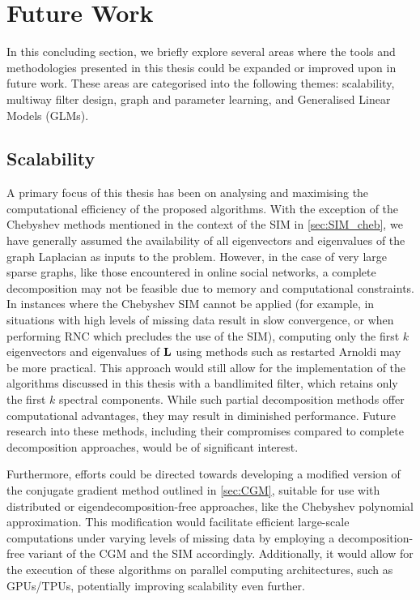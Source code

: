 \section{Future Work}

In this concluding section, we briefly explore several areas where the tools and methodologies presented in this thesis could be expanded or improved upon in future work. These areas are categorised into the following themes: scalability, multiway filter design, graph and parameter learning, and Generalised Linear Models (GLMs).

\subsection{Scalability}

A primary focus of this thesis has been on analysing and maximising the computational efficiency of the proposed algorithms. With the exception of the Chebyshev methods mentioned in the context of the SIM in \cref{sec:SIM_cheb}, we have generally assumed the availability of all eigenvectors and eigenvalues of the graph Laplacian as inputs to the problem. However, in the case of very large sparse graphs, like those encountered in online social networks, a complete decomposition may not be feasible due to memory and computational constraints. In instances where the Chebyshev SIM cannot be applied (for example, in situations with high levels of missing data result in slow convergence, or when performing RNC which precludes the use of the SIM), computing only the first $k$ eigenvectors and eigenvalues of $\mathbf{L}$ using methods such as restarted Arnoldi \citep{Lehoucq1998} may be more practical. This approach would still allow for the implementation of the algorithms discussed in this thesis with a bandlimited filter, which retains only the first $k$ spectral components. While such partial decomposition methods offer computational advantages, they may result in diminished performance. Future research into these methods, including their compromises compared to complete decomposition approaches, would be of significant interest.

Furthermore, efforts could be directed towards developing a modified version of the conjugate gradient method outlined in \cref{sec:CGM}, suitable for use with distributed or eigendecomposition-free approaches, like the Chebyshev polynomial approximation. This modification would facilitate efficient large-scale computations under varying levels of missing data by employing a decomposition-free variant of the CGM and the SIM accordingly. Additionally, it would allow for the execution of these algorithms on parallel computing architectures, such as GPUs/TPUs, potentially improving scalability even further.

